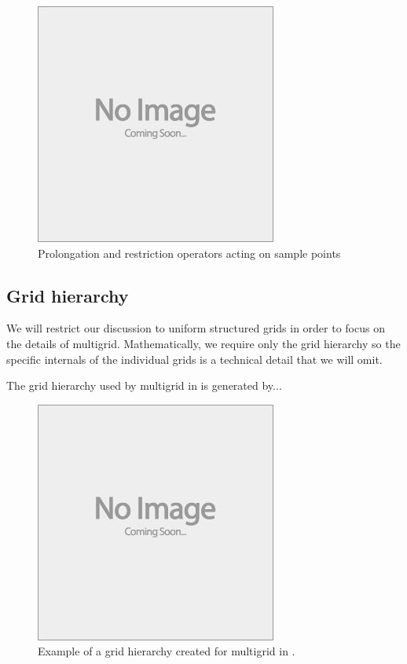 


\begin{figure}
	\centering
	\includegraphics[draft]{images/placeholder}
	\caption{Prolongation and restriction operators acting on sample points}
\end{figure}




\subsection{Grid hierarchy}

We will restrict our discussion to uniform structured grids in order to focus on the details of multigrid.
Mathematically, we require only the grid hierarchy so the specific internals of the individual grids is a technical detail that we will omit. 

The grid hierarchy used by multigrid in \oomph is generated by... 



\begin{figure}
	\centering
	\includegraphics[draft]{images/placeholder}
	\caption{Example of a grid hierarchy created for multigrid in \oomph.}
\end{figure}





